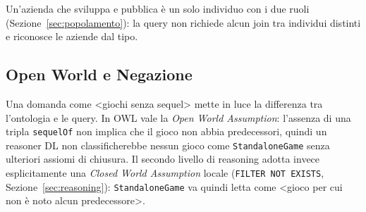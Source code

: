 Un'azienda che sviluppa e pubblica \`e un solo individuo con i due ruoli (Sezione~\ref{sec:popolamento}):
la query non richiede alcun join tra individui distinti e riconosce le aziende dal tipo.

\subsection{Open World e Negazione}

Una domanda come \textless{}giochi senza sequel\textgreater{} mette in luce la differenza
tra l'ontologia e le query. In OWL vale la \textit{Open World Assumption}: l'assenza di
una tripla \texttt{sequelOf} non implica che il gioco non abbia predecessori, quindi un
reasoner DL non classificherebbe nessun gioco come \texttt{StandaloneGame} senza
ulteriori assiomi di chiusura. Il secondo livello di reasoning adotta invece
esplicitamente una \textit{Closed World Assumption} locale (\texttt{FILTER NOT EXISTS},
Sezione~\ref{sec:reasoning}): \texttt{StandaloneGame} va quindi letta come
\textless{}gioco per cui non \`e noto alcun predecessore\textgreater{}.

\fussy
